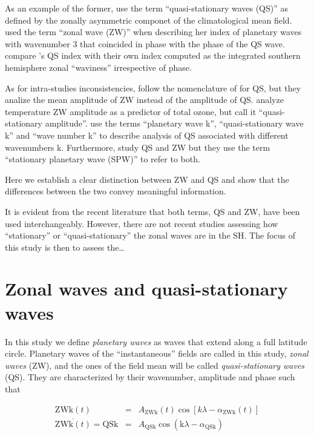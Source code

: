 \documentclass[draft,linenumbers]{agujournal2018}
\begin{document}
As an example of the former, \citet{Quintanar1995a} use the term
``quasi-stationary waves (QS)'' as defined by the zonally asymmetric
componet of the climatological mean field. \citet{Raphael2004} used the
term ``zonal wave (ZW)'' when describing her index of planetary waves
with wavenumber 3 that coincided in phase with the phase of the QS wave.
\citet{Irving2015} compare \citet{Raphael2004}'s QS index with their own
index computed as the integrated southern hemisphere zonal ``waviness''
irrespective of phase.

As for intra-studies inconsistencies, \citet{Rao2004} follow the
nomenclature of \citet{Quintanar1995a} for QS, but they analize the mean
amplitude of ZW instead of the amplitude of QS. \citet{Kravchenko2012}
analyze temperature ZW amplitude as a predictor of total ozone, but call
it ``quasi-stationary amplitude''. \citet{Turner2017} use the terms
``planetary wave k'', ``quasi-stationary wave k'' and ``wave number k''
to describe analysis of QS associated with different wavenumbers k.
Furthermore, \citet{Lastovicka2018} study QS and ZW but they use the
term ``stationary planetary wave (SPW)'' to refer to both.

Here we establish a clear distinction between ZW and QS and show that
the differences between the two convey meaningful information.

It is evident from the recent literature that both terms, QS and ZW,
have been used interchangeably. However, there are not recent studies
assessing how ``stationary'' or ``quasi-stationary'' the zonal waves are
in the SH. The focus of this study is then to assess the\ldots{}

\section{Zonal waves and quasi-stationary waves}

In this study we define \emph{planetary waves} as waves that extend
along a full latitude circle. Planetary waves of the ``instantaneous''
fields are called in this study, \emph{zonal waves} (ZW), and the ones
of the field mean will be called \emph{quasi-stationary waves} (QS).
They are characterized by their wavenumber, amplitude and phase such
that

\begin{linenomath*}
\begin{eqnarray}\label{eq:ZW}
\mathrm{ZWk}(t) & = & A_\mathrm{ZWk}(t)\cos \left [ k\lambda - \alpha_\mathrm{ZWk}(t) \right ] \\ 
\overline{\mathrm{ZWk}(t)} = \mathrm{QSk} & = & A_\mathrm{QSk}\cos \left (  \mathrm{k}\lambda - \alpha_\mathrm{QSk} \right ) \label{eq:QS}
\end{eqnarray}
\end{linenomath*}
\end{document}
